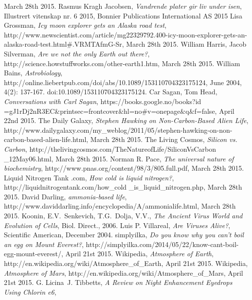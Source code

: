 \begin{thebibliography}{99}
		March 28th 2015.
		Rasmus Kragh Jacobsen,
		\emph{Vandrende plater gir liv under isen},
		Illustrert vitenskap nr. 6 2015,
		Bonnier Publications International AS
		2015
		Lisa Grossman,
		\emph{Icy moon explorer gets an Alaska road test},
		http://www.newscientist.com/article/mg22329792.400-icy-moon-explorer-gets-an-alaska-road-test.html\#.VRMTAfmG-Sr,
		March 28th 2015.
		William Harris, Jacob Silverman,
		\emph{Are we not the only Earth out there?},
		http://science.howstuffworks.com/other-earth1.htm,
		March 28th 2015.
		William Bains,
		\emph{Astrobiology},
		http://online.liebertpub.com/doi/abs/10.1089/153110704323175124,
		June 2004, 4(2): 137-167. doi:10.1089/153110704323175124.
		Car Sagan, Tom Head,
		\emph{Conversations with Carl Sagan},
		https://books.google.no/books?id =gJ1rDj2nR3EC\&printsec=frontcover\&hl=no\#v=onepage\&q\&f=false,
		April 22nd 2015.
		The Daily Galaxy,
		\emph{Stephen Hawking on Non-Carbon-Based Alien Life},
		http://www.dailygalaxy.com/my\_weblog/2011/05/stephen-hawking-on-non-carbon-based-alien-life.html,
		March 28th 2015.
		The Living Cosmos,
		\emph{Silicon vs. Carbon},
		http://thelivingcosmos.com/TheNatureofLife/SiliconVsCarbon \_12May06.html,
		March 28th 2015.
		Norman R. Pace,
		\emph{The universal nature of biochemistry},
		http://www.pnas.org/content/98/3/805.full.pdf,
		March 28th 2015.
		Liquid Nitrogen Tank .com,
		\emph{How cold is liquid nitrogen?},
		http://liquidnitrogentank.com/how\_cold \_is\_liquid\_nitrogen.php,
		March 28th 2015.
		David Darling,
		\emph{ammonia-based life},
		http://www.daviddarling.info/encyclopedia/A/ammonialife.html,
		March 28th 2015.
		Koonin, E.V.\, Senkevich, T.G.\, Dolja, V.V.,
		\emph{The Ancient Virus World and Evolution of Cells},
		Biol. Direct.,
		2006.
		Luis P. Villareal,
		\emph{Are Viruses Alive?},
		Scientific American,
		December 2004.
		simplyilka,
		\emph{Do you know why you can’t boil an egg on Mount Everest?},
		http://simplyilka.com/2014/05/22/know-cant-boil-egg-mount-everest/,
		April 21st 2015.
		Wikipedia,
		\emph{Atmosphere of Earth},
		http://en.wikipedia.org/wiki/Atmosphere\_of\_Earth,
		April 21st 2015.
		Wikipedia,
		\emph{Atmosphere of Mars},
		http://en.wikipedia.org/wiki/Atmosphere\_of\_Mars,
		April 21st 2015.
		G. Licina\, J. Tibbetts,
		\emph{A Review on Night Enhancement Eyedrops Using Chlorin e6},

\end{thebibliography}
